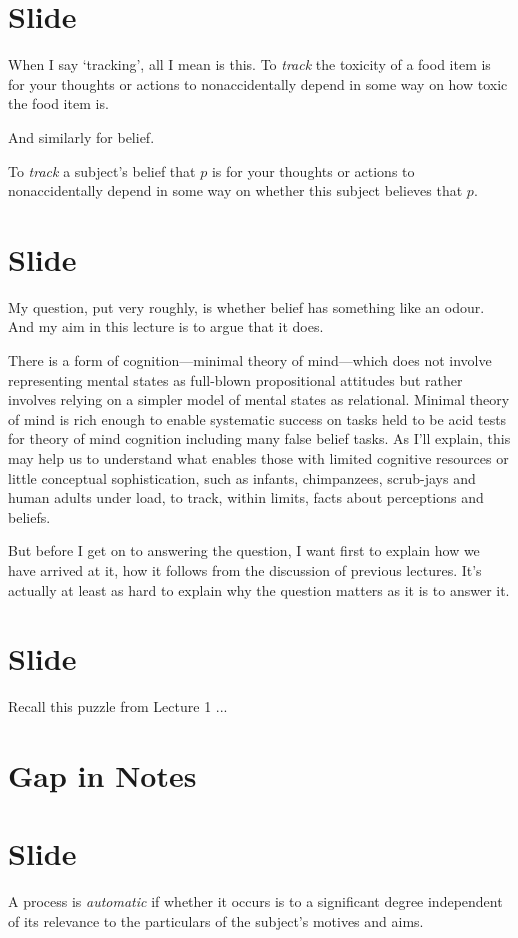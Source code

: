 \documentclass[12pt,\papersize]{extarticle}
\begin{document}
\section{Slide}
When I say `tracking', all I mean is this.
To \textit{track} the toxicity of a food item is for your thoughts or actions to nonaccidentally depend in some way on how toxic the food item is.

And similarly for belief.

To \textit{track} a subject's belief that $p$ is for your thoughts or actions to nonaccidentally depend in some way on whether this subject believes that $p$.

\section{Slide}
My question, put very roughly, is whether belief has something like an odour.
And my aim in this lecture is to argue that it does.

There is a form of cognition---minimal theory of mind---which does not involve representing mental states as full-blown propositional attitudes but rather involves relying on a simpler model of mental states as relational.
Minimal theory of mind 
is  rich enough to enable systematic success on tasks held to be acid tests for theory of mind cognition including many false belief tasks.
As I'll explain, this may help us to understand what enables those with limited cognitive resources or little conceptual sophistication, such as infants, chimpanzees, scrub-jays and human adults under load, to track, within limits, facts about perceptions and beliefs.

But before I get on to answering the question, I want first to explain how we have arrived at it, how it follows from the discussion of previous lectures.
It’s actually at least as hard to explain why the question matters as it is to answer it.

\section{Slide}
Recall this puzzle from Lecture 1
...

\section{Gap in Notes}

\section{Slide}
A process is \emph{automatic} if whether it occurs is to a significant degree independent of its relevance to the particulars of the subject's motives and aims.
\end{document}
